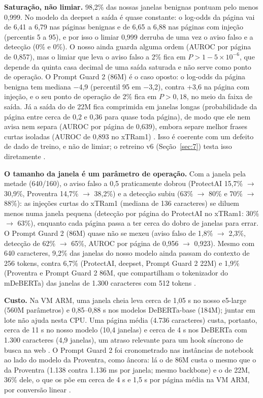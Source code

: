 \documentclass[11pt]{article}
\begin{document}
\textbf{Saturação, não limiar.} 98,2\% das nossas janelas benignas pontuam pelo menos 0,999. No modelo da deepset a saída é quase constante: o log-odds da página vai de 6,41 a 6,79 nas páginas benignas e de 6,65 a 6,88 nas páginas com injeção (percentis 5 a 95), e por isso o limiar 0,999 derruba de uma vez o aviso falso e a detecção (0\% e 0\%). O nosso ainda guarda alguma ordem (AUROC por página de 0,857), mas o limiar que leva o aviso falso a 2\% fica em $P > 1-5\times10^{-6}$, que depende da quinta casa decimal de uma saída saturada e não serve como ponto de operação. O Prompt Guard 2 (86M) é o caso oposto: o log-odds da página benigna tem mediana \ensuremath{-}4,9 (percentil 95 em \ensuremath{-}3,2), contra +3,6 na página com injeção, e o seu ponto de operação de 2\% fica em $P > 0{,}18$, no meio da faixa de saída. Já a saída do de 22M fica comprimida em janelas longas (probabilidade da página entre cerca de 0,2 e 0,36 para quase toda página), de modo que ele nem avisa nem separa (AUROC por página de 0,639), embora separe melhor frases curtas isoladas (AUROC de 0,893 no xTRam1)%
. Isso é coerente com um defeito de dado de treino, e não de limiar; o retreino v6 (Seção~\ref{sec:7}) testa isso diretamente%
.

\textbf{O tamanho da janela é um parâmetro de operação.} Com a janela pela metade (640/160), o aviso falso a 0,5 praticamente dobrou (ProtectAI 15,7\% \ensuremath{\rightarrow} 30,9\%, Proventra 14,7\% \ensuremath{\rightarrow} 38,2\%) e a detecção subiu (63\% \ensuremath{\rightarrow} 80\% e 70\% \ensuremath{\rightarrow} 88\%): as injeções curtas do xTRam1 (mediana de 136 caracteres) se diluem menos numa janela pequena (detecção por página do ProtectAI no xTRam1: 30\% \ensuremath{\rightarrow} 63\%), enquanto cada página passa a ter cerca do dobro de janelas para errar. O Prompt Guard 2 (86M) quase não se mexeu (aviso falso de 1,8\% \ensuremath{\rightarrow} 2,3\%, detecção de 62\% \ensuremath{\rightarrow} 65\%, AUROC por página de 0,956 \ensuremath{\rightarrow} 0,923). Mesmo com 640 caracteres, 9,2\% das janelas do nosso modelo ainda passam do contexto de 256 tokens, contra 6,7\% (ProtectAI, deepset, Prompt Guard 2 22M) e 1,9\% (Proventra e Prompt Guard 2 86M, que compartilham o tokenizador do mDeBERTa) das janelas de 1.300 caracteres com 512 tokens%
.

\textbf{Custo.} Na VM ARM, uma janela cheia leva cerca de 1,05 s no nosso e5-large (560M parâmetros) e 0,85–0,88 s nos modelos DeBERTa-base (184M); juntar em lote não ajuda nesta CPU. Uma página média (4.736 caracteres) custa, portanto, cerca de 11 s no nosso modelo (10,4 janelas) e cerca de 4 s nos DeBERTa com 1.300 caracteres (4,9 janelas), um atraso relevante para um hook síncrono de busca na web%
. O Prompt Guard 2 foi cronometrado nas instâncias de notebook ao lado do modelo da Proventra, como âncora: lá o de 86M custa o mesmo que o da Proventra (1.138 contra 1.136 ms por janela; mesmo backbone) e o de 22M, 36\% dele, o que os põe em cerca de 4 s e 1,5 s por página média na VM ARM, por conversão linear%
.
\end{document}
